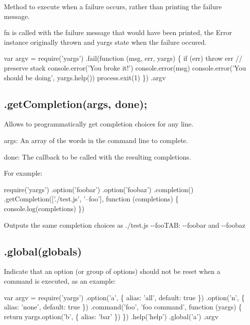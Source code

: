 Method to execute when a failure occurs, rather than printing the failure message.

{\ttfamily fn} is called with the failure message that would have been printed, the {\ttfamily Error} instance originally thrown and yargs state when the failure occured.


\begin{DoxyCode}
var argv = require('yargs')
  .fail(function (msg, err, yargs) \{
    if (err) throw err // preserve stack
    console.error('You broke it!')
    console.error(msg)
    console.error('You should be doing', yargs.help())
    process.exit(1)
  \})
  .argv
\end{DoxyCode}


\subsection*{.get\+Completion(args, done); }

Allows to programmatically get completion choices for any line.

{\ttfamily args}\+: An array of the words in the command line to complete.

{\ttfamily done}\+: The callback to be called with the resulting completions.

For example\+:


\begin{DoxyCode}
require('yargs')
  .option('foobar')
  .option('foobaz')
  .completion()
  .getCompletion(['./test.js', '--foo'], function (completions) \{
    console.log(completions)
  \})
\end{DoxyCode}


Outputs the same completion choices as {\ttfamily ./test.js -\/-\/foo}{\ttfamily T\+AB}\+: {\ttfamily -\/-\/foobar} and {\ttfamily -\/-\/foobaz}

\subsection*{\label{_global}%
.global(globals) }

Indicate that an option (or group of options) should not be reset when a command is executed, as an example\+:


\begin{DoxyCode}
var argv = require('yargs')
  .option('a', \{
    alias: 'all',
    default: true
  \})
  .option('n', \{
    alias: 'none',
    default: true
  \})
  .command('foo', 'foo command', function (yargs) \{
    return yargs.option('b', \{
      alias: 'bar'
    \})
  \})
  .help('help')
  .global('a')
  .argv
\end{DoxyCode}


